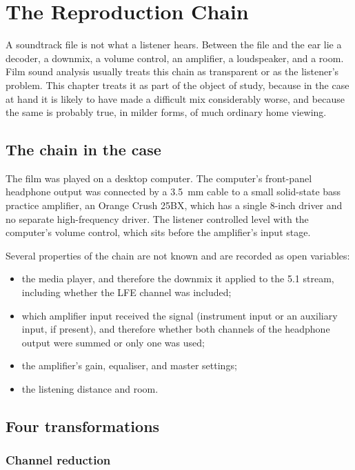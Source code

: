 \chapter{The Reproduction Chain}
\label{ch:chain}

A soundtrack file is not what a listener hears. Between the file and the ear lie a decoder, a downmix, a volume control, an amplifier, a loudspeaker, and a room. Film sound analysis usually treats this chain as transparent or as the listener's problem. This chapter treats it as part of the object of study, because in the case at hand it is likely to have made a difficult mix considerably worse, and because the same is probably true, in milder forms, of much ordinary home viewing.

\section{The chain in the case}

The film was played on a desktop computer. The computer's front-panel headphone output was connected by a 3.5~mm cable to a small solid-state bass practice amplifier, an Orange Crush 25BX, which has a single 8-inch driver and no separate high-frequency driver. The listener controlled level with the computer's volume control, which sits before the amplifier's input stage.

Several properties of the chain are not known and are recorded as open variables:
\begin{itemize}
\item the media player, and therefore the downmix it applied to the 5.1 stream, including whether the LFE channel was included;
\item which amplifier input received the signal (instrument input or an auxiliary input, if present), and therefore whether both channels of the headphone output were summed or only one was used;
\item the amplifier's gain, equaliser, and master settings;
\item the listening distance and room.
\end{itemize}

\section{Four transformations}

\subsection{Channel reduction}

